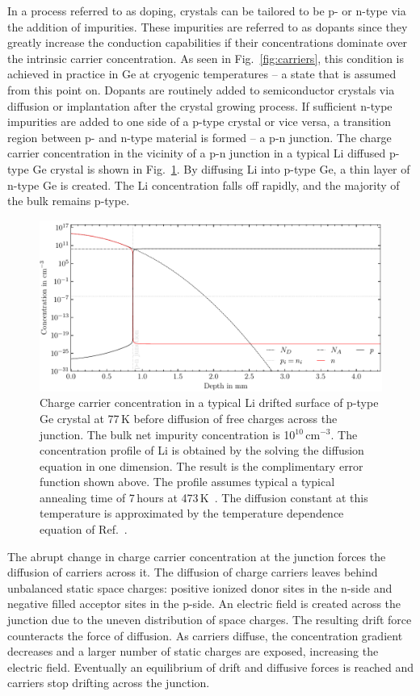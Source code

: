 In a process referred to as doping, crystals can be tailored to be p- or n-type via the addition of impurities. These impurities are referred to as dopants since they greatly increase the conduction capabilities if their concentrations dominate over the intrinsic carrier concentration. As seen in Fig.~\ref{fig:carriers}, this condition is achieved in practice in Ge at cryogenic temperatures -- a state that is assumed from this point on. Dopants are routinely added to semiconductor crystals via diffusion or implantation after the crystal growing process. If sufficient n-type impurities are added to one side of a p-type crystal or vice versa, a transition region between p- and n-type material is formed -- a p-n junction. The charge carrier concentration in the vicinity of a p-n junction in a typical Li diffused p-type Ge crystal is shown in Fig.~\ref{fig:lithium_carriers}. By diffusing Li into p-type Ge, a thin layer of n-type Ge is created. The Li concentration falls off rapidly, and the majority of the bulk remains p-type.  

\begin{figure}[htb]
	\centering
	\includegraphics[width=6in]{figs/ge/pn_junction_width_6_9in.pdf}
	\caption{Charge carrier concentration in a typical Li drifted surface of p-type Ge crystal at 77\,K before diffusion of free charges across the junction. The bulk net impurity concentration is 10$^{10}$\,cm$^{-3}$. The concentration profile of Li is obtained by the solving the diffusion equation in one dimension. The result is the complimentary error function shown above. The profile assumes typical a typical annealing time of 7\,hours at 473\,K~\cite{bjorn}. The diffusion constant at this temperature is approximated by the temperature dependence equation of Ref.~\cite{lithium_diffusion}.} 
	\label{fig:lithium_carriers}
\end{figure}

The abrupt change in charge carrier concentration at the junction forces the diffusion of carriers across it. The diffusion of charge carriers leaves behind unbalanced static space charges: positive ionized donor sites in the n-side and negative filled acceptor sites in the p-side. An electric field is created across the junction due to the uneven distribution of space charges. The resulting drift force counteracts the force of diffusion. As carriers diffuse, the concentration gradient decreases and a larger number of static charges are exposed, increasing the electric field. Eventually an equilibrium of drift and diffusive forces is reached and carriers stop drifting across the junction.

